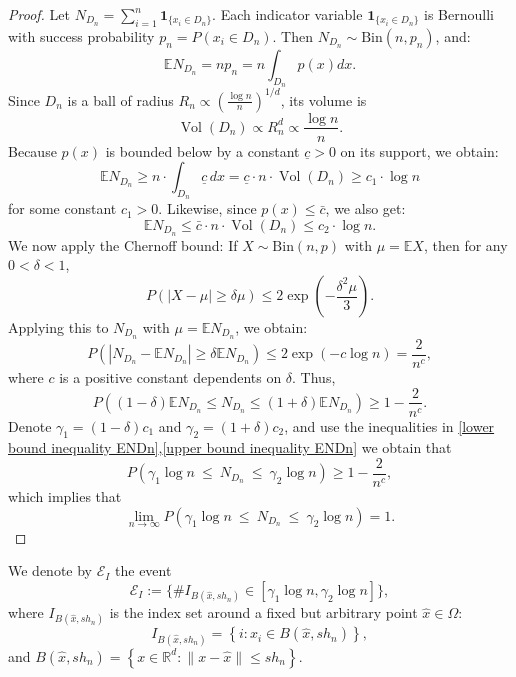 \documentclass{article}
\begin{document}
\begin{proof}
Let \( N_{D_n} = \sum_{i=1}^n \mathbf{1}_{\{x_i \in D_n\}} \). Each indicator variable \( \mathbf{1}_{\{x_i \in D_n\}} \) is Bernoulli with success probability \( p_n = P(x_i \in D_n) \). Then \( N_{D_n} \sim \text{Bin}(n, p_n) \), and:
\[
\mathbb{E} N_{D_n} = n p_n = n \int_{D_n} p(x) dx.
\]
Since \( D_n \) is a ball of radius \( R_n  \propto \left(\frac{\log n}{n}\right)^{1/d} \), its volume is
\[
\operatorname{Vol}(D_n) \propto  R_n^d \propto \frac{\log n}{n}.
\]
Because \( p(x) \) is bounded below by a constant \( \underline{c} > 0 \) on its support, we obtain:
\begin{equation}
    \mathbb{E} N_{D_n} \geq n \cdot \int_{D_n} \underline{c} \, dx = \underline{c} \cdot n \cdot \operatorname{Vol}(D_n) \geq c_1 \cdot \log n
    \label{lower bound inequality ENDn}
\end{equation}
for some constant \( c_1 > 0 \). Likewise, since \( p(x) \leq \bar{c} \), we also get:
\begin{equation}
    \mathbb{E} N_{D_n} \leq \bar{c} \cdot n \cdot \operatorname{Vol}(D_n) \leq c_2 \cdot \log n.
\label{upper bound inequality ENDn}
\end{equation}
We now apply the Chernoff bound: If \( X \sim \text{Bin}(n, p) \) with \( \mu = \mathbb{E}X \), then for any \( 0 < \delta < 1 \),
\[
P\left(|X - \mu| \geq \delta \mu\right) \leq 2 \exp\left(-\frac{\delta^2 \mu}{3}\right).
\]
Applying this to \( N_{D_n} \) with \( \mu = \mathbb{E} N_{D_n} \), we obtain:
\[
P\left( \left| N_{D_n} - \mathbb{E} N_{D_n} \right| \geq \delta \mathbb{E} N_{D_n} \right) \leq 2 \exp\left(-c \log n\right) = \frac{2}{n^c},
\]
where $c$ is a positive constant dependents on $\delta$.
Thus, 
\begin{equation}
    P\left((1 - \delta) \mathbb{E} N_{D_n}\leq N_{D_n} \leq (1 + \delta) \mathbb{E} N_{D_n}\right)\geq 1-\frac{2}{n^c}.
\end{equation}
Denote $\gamma_1=(1-\delta)c_1$ and  $\gamma_2=(1+\delta)c_2 $, and use the inequalities in \eqref{lower bound inequality ENDn},\eqref{upper bound inequality ENDn} we obtain that
\begin{equation}
    P\left( \gamma_1 \log n \ \leq\ N_{D_n} \ \leq\ \gamma_2 \log n \right) \geq 1-\frac{2}{n^c},
    \label{the probability of expected number of samples in D_n}
\end{equation}
which implies that 
$$
\lim_{n \to \infty} P\left( \gamma_1 \log n \ \leq\ N_{D_n} \ \leq\ \gamma_2 \log n \right) = 1.
$$
\end{proof}
We denote by $\mathscr{E}_I $ the event  
\begin{equation}
    \mathscr{E}_I:=\{ \# I_{B(\hat{x}, s h_n)} \in [\gamma_1 \log n,\gamma_2 \log n] \},
\label{E_I event}
\end{equation}
where $I_{B(\hat{x}, s h_n)}$ is the index set around a fixed but arbitrary point $\hat{x}\in\Omega$:
$$
I_{B\left(\hat{x},sh_n\right)}=\left\{i: x_i \in B\left(\hat{x},sh_n\right)\right\},
$$
and $B\left(\hat{x}, sh_n\right)=\left\{x \in \mathbb{R}^d:\|x-\hat{x}\| \leq sh_n\right\}$.
\end{document}
